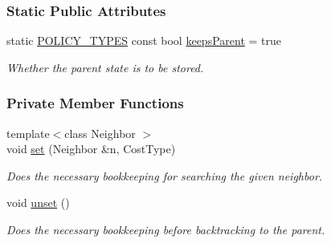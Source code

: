 \subsubsection*{Static Public Attributes}
\begin{DoxyCompactItemize}
\item 
static \hyperlink{extensions_2shared__policies_2headers_8h_ae70a06fa4631780beea14971eb36a562}{P\+O\+L\+I\+C\+Y\+\_\+\+T\+Y\+P\+ES} const bool \hyperlink{structslb_1_1ext_1_1policy_1_1backtrackLock_1_1Copy_ae204f588322f4f8327718d3d58a9f716}{keeps\+Parent} = true\hypertarget{structslb_1_1ext_1_1policy_1_1backtrackLock_1_1Copy_ae204f588322f4f8327718d3d58a9f716}{}\label{structslb_1_1ext_1_1policy_1_1backtrackLock_1_1Copy_ae204f588322f4f8327718d3d58a9f716}

\begin{DoxyCompactList}\small\item\em Whether the parent state is to be stored. \end{DoxyCompactList}\end{DoxyCompactItemize}
\subsubsection*{Private Member Functions}
\begin{DoxyCompactItemize}
\item 
{\footnotesize template$<$class Neighbor $>$ }\\void \hyperlink{structslb_1_1ext_1_1policy_1_1backtrackLock_1_1Copy_a97bcf903d70593af7932470f2fd0051b}{set} (Neighbor \&n, Cost\+Type)
\begin{DoxyCompactList}\small\item\em Does the necessary bookkeeping for searching the given neighbor. \end{DoxyCompactList}\item 
void \hyperlink{structslb_1_1ext_1_1policy_1_1backtrackLock_1_1Copy_a5422a7c3500ba11c4f2ee3b09a96e7fb}{unset} ()\hypertarget{structslb_1_1ext_1_1policy_1_1backtrackLock_1_1Copy_a5422a7c3500ba11c4f2ee3b09a96e7fb}{}\label{structslb_1_1ext_1_1policy_1_1backtrackLock_1_1Copy_a5422a7c3500ba11c4f2ee3b09a96e7fb}

\begin{DoxyCompactList}\small\item\em Does the necessary bookkeeping before backtracking to the parent. \end{DoxyCompactList}\end{DoxyCompactItemize}
